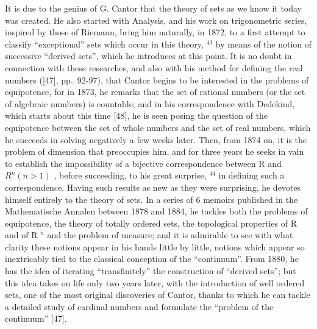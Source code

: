 It is due to the genius of G. Cantor that the theory of sets as we know it today was created. He also started with Analysis, and his work on trigonometric series, inspired by those of Riemann, bring him naturally, in 1872, to a first attempt to classify ``exceptional'' sets which occur in this theory, \(^{43}\) by means of the notion of successive ``derived sets'', which he introduces at this point. It is no doubt in connection with these researches, and also with his method for defining the real numbers ({[}47{]}, pp.~92-97), that Cantor begins to be interested in the problems of equipotence, for in 1873, he remarks that the set of rational numbers (or the set of algebraic numbers) is countable; and in his correspondence with Dedekind, which starts about this time {[}48{]}, he is seen posing the question of the equipotence between the set of whole numbers and the set of real numbers, which he succeeds in solving negatively a few weeks later. Then, from 1874 on, it is the problem of dimension that preoccupies him, and for three years he seeks in vain to establish the impossibility of a bijective correspondence between R and \(R^{n}(n > 1)\) , before succeeding, to his great surprise, \(^{44}\) in defining such a correspondence. Having such results as new as they were surprising, he devotes himself entirely to the theory of sets. In a series of 6 memoirs published in the Mathematische Annalen between 1878 and 1884, he tackles both the problems of equipotence, the theory of totally ordered sets, the topological properties of R and of R \(^{n}\) and the problem of measure; and it is admirable to see with what clarity these notions appear in his hands little by little, notions which appear so inextricably tied to the classical conception of the ``continuum''. From 1880, he has the idea of iterating ``transfinitely'' the construction of ``derived sets''; but this idea takes on life only two years later, with the introduction of well ordered sets, one of the most original discoveries of Cantor, thanks to which he can tackle a detailed study of cardinal numbers and formulate the ``problem of the continuum'' {[}47{]}.

